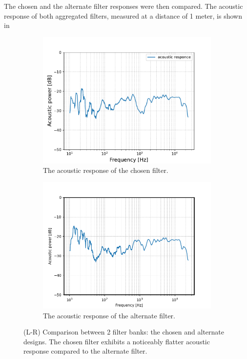 The chosen and the alternate filter responses were then compared. The acoustic response of both aggregated filters, measured at a distance of 1 meter, is shown in  
\begin{figure}[H]
    \centering
    \begin{subfigure}[t]{0.48\textwidth}
        \centering
        \includegraphics[width=\textwidth]{TU Delft Booming Bass Project Report/figures/FilterGroup/acoustic_response.pdf}
        \caption{The acoustic response of the chosen filter.}
        \label{fig:frequency_response}
    \end{subfigure}
    \hfill
     \begin{subfigure}[t]{0.48\textwidth}
         \centering
        \includegraphics[width=\textwidth]{TU Delft Booming Bass Project Report/figures/FilterGroup/response_of_alternate_filterbank.png}
        \caption{The acoustic response of the alternate filter.}
        \label{fig:freq response alternate}
    \end{subfigure}
    
    \captionsetup{justification=raggedright, labelfont=bf}
    \caption{(L-R) Comparison between 2 filter banks: the chosen and alternate designs. The chosen filter exhibits a noticeably flatter acoustic response compared to the alternate filter.}
    \label{fig:combined_response_with_alternate}
\end{figure}

